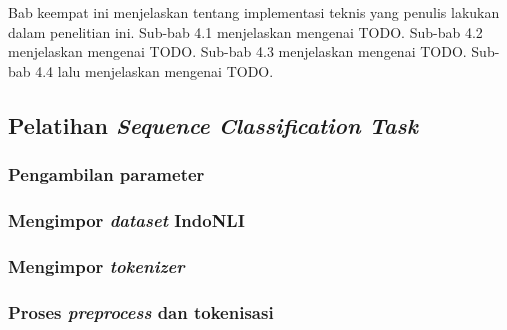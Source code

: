 \chapter{\babEmpat}
\label{bab:4}
Bab keempat ini menjelaskan tentang implementasi teknis yang penulis lakukan dalam penelitian ini. Sub-bab 4.1 menjelaskan mengenai TODO. Sub-bab 4.2 menjelaskan mengenai  TODO. Sub-bab 4.3 menjelaskan mengenai TODO. Sub-bab 4.4 lalu menjelaskan mengenai TODO.

\section{Pelatihan \emph{Sequence Classification Task}}

\subsection{Pengambilan parameter}

\subsection{Mengimpor \emph{dataset} IndoNLI}

\subsection{Mengimpor \emph{tokenizer}}

\subsection{Proses \emph{preprocess} dan tokenisasi}

